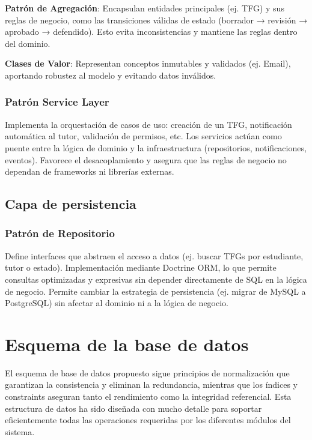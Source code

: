 \documentclass[12pt,a4paper,oneside]{report}
\begin{document}
\textbf{Patrón de Agregación}: Encapsulan entidades principales (ej. TFG) y sus reglas de negocio, como las transiciones válidas de estado (borrador → revisión → aprobado → defendido). Esto evita inconsistencias y mantiene las reglas dentro del dominio.

\textbf{Clases de Valor}: Representan conceptos inmutables y validados (ej. Email), aportando robustez al modelo y evitando datos inválidos.

\subsubsection{Patrón Service Layer}\label{patruxf3n-service-layer}

Implementa la orquestación de casos de uso: creación de un TFG, notificación automática al tutor, validación de permisos, etc. Los servicios actúan como puente entre la lógica de dominio y la infraestructura (repositorios, notificaciones, eventos). Favorece el desacoplamiento y asegura que las reglas de negocio no dependan de frameworks ni librerías externas. 

\subsection{Capa de persistencia}\label{capa-de-persistencia}

\subsubsection{Patrón de Repositorio}\label{repository-pattern}

Define interfaces que abstraen el acceso a datos (ej. buscar TFGs por estudiante, tutor o estado). Implementación mediante Doctrine ORM, lo que permite consultas optimizadas y expresivas sin depender directamente de SQL en la lógica de negocio. Permite cambiar la estrategia de persistencia (ej. migrar de MySQL a PostgreSQL) sin afectar al dominio ni a la lógica de negocio. 

\section{Esquema de la base de datos}\label{esquema-de-la-base-de-datos}

El esquema de base de datos propuesto sigue principios de normalización
que garantizan la consistencia y eliminan la redundancia, mientras que
los índices y constraints aseguran tanto el rendimiento como la
integridad referencial. Esta estructura de datos ha sido
diseñada con mucho detalle para soportar eficientemente todas las operaciones requeridas
por los diferentes módulos del sistema.
\end{document}
